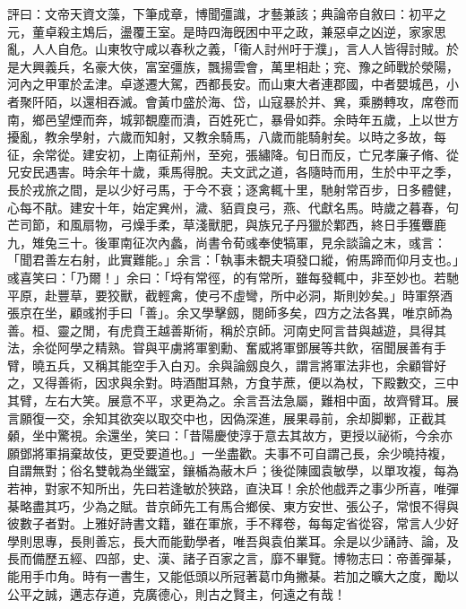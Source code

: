 \begin{pinyinscope}
評曰：文帝天資文藻，下筆成章，博聞彊識，才藝兼該；典論帝自敘曰：初平之元，董卓殺主鴆后，盪覆王室。是時四海旣困中平之政，兼惡卓之凶逆，家家思亂，人人自危。山東牧守咸以春秋之義，「衞人討州吁于濮」，言人人皆得討賊。於是大興義兵，名豪大俠，富室彊族，飄揚雲會，萬里相赴；兖、豫之師戰於滎陽，河內之甲軍於孟津。卓遂遷大駕，西都長安。而山東大者連郡國，中者嬰城邑，小者聚阡陌，以還相吞滅。會黃巾盛於海、岱，山寇暴於并、兾，乘勝轉攻，席卷而南，鄉邑望煙而奔，城郭覩塵而潰，百姓死亡，暴骨如莽。余時年五歲，上以世方擾亂，教余學射，六歲而知射，又教余騎馬，八歲而能騎射矣。以時之多故，每征，余常從。建安初，上南征荊州，至宛，張繡降。旬日而反，亡兄孝廉子脩、從兄安民遇害。時余年十歲，乘馬得脫。夫文武之道，各隨時而用，生於中平之季，長於戎旅之間，是以少好弓馬，于今不衰；逐禽輒十里，馳射常百步，日多體健，心每不猒。建安十年，始定兾州，濊、貊貢良弓，燕、代獻名馬。時歲之暮春，句芒司節，和風扇物，弓燥手柔，草淺獸肥，與族兄子丹獵於鄴西，終日手獲麞鹿九，雉兔三十。後軍南征次內蠡，尚書令荀彧奉使犒軍，見余談論之末，彧言：「聞君善左右射，此實難能。」余言：「執事未覩夫項發口縱，俯馬蹄而仰月支也。」彧喜笑曰：「乃爾！」余曰：「埒有常徑，的有常所，雖每發輒中，非至妙也。若馳平原，赴豐草，要狡獸，截輕禽，使弓不虛彎，所中必洞，斯則妙矣。」時軍祭酒張京在坐，顧彧拊手曰「善」。余又學擊劔，閱師多矣，四方之法各異，唯京師為善。桓、靈之閒，有虎賁王越善斯術，稱於京師。河南史阿言昔與越遊，具得其法，余從阿學之精熟。甞與平虜將軍劉勳、奮威將軍鄧展等共飲，宿聞展善有手臂，曉五兵，又稱其能空手入白刃。余與論劔良久，謂言將軍法非也，余顧甞好之，又得善術，因求與余對。時酒酣耳熱，方食芋蔗，便以為杖，下殿數交，三中其臂，左右大笑。展意不平，求更為之。余言吾法急屬，難相中面，故齊臂耳。展言願復一交，余知其欲突以取交中也，因偽深進，展果尋前，余却脚鄛，正截其顙，坐中驚視。余還坐，笑曰：「昔陽慶使淳于意去其故方，更授以祕術，今余亦願鄧將軍捐棄故伎，更受要道也。」一坐盡歡。夫事不可自謂己長，余少曉持複，自謂無對；俗名雙戟為坐鐵室，鑲楯為蔽木戶；後從陳國袁敏學，以單攻複，每為若神，對家不知所出，先曰若逢敏於狹路，直決耳！余於他戲弄之事少所喜，唯彈棊略盡其巧，少為之賦。昔京師先工有馬合鄉侯、東方安世、張公子，常恨不得與彼數子者對。上雅好詩書文籍，雖在軍旅，手不釋卷，每每定省從容，常言人少好學則思專，長則善忘，長大而能勤學者，唯吾與袁伯業耳。余是以少誦詩、論，及長而備歷五經、四部，史、漢、諸子百家之言，靡不畢覽。博物志曰：帝善彈棊，能用手巾角。時有一書生，又能低頭以所冠著葛巾角撇棊。若加之曠大之度，勵以公平之誠，邁志存道，克廣德心，則古之賢主，何遠之有哉！


\end{pinyinscope}